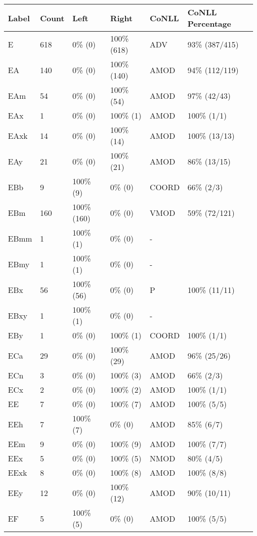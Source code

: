 \begin{figure*}
\begin{tabular}{|l|l|l|l||l|l|}
\hline
Label & Count & Left & Right & CoNLL & CoNLL Percentage\\ 
\hline
 E & 618 & 0\% (0) & 100\% (618) & ADV & 93\% (387/415) \\ 
\hline
 EA & 140 & 0\% (0) & 100\% (140) & AMOD & 94\% (112/119) \\ 
\hline
 EAm & 54 & 0\% (0) & 100\% (54) & AMOD & 97\% (42/43) \\ 
\hline
 EAx & 1 & 0\% (0) & 100\% (1) & AMOD & 100\% (1/1) \\ 
\hline
 EAxk & 14 & 0\% (0) & 100\% (14) & AMOD & 100\% (13/13) \\ 
\hline
 EAy & 21 & 0\% (0) & 100\% (21) & AMOD & 86\% (13/15) \\ 
\hline
 EBb & 9 & 100\% (9) & 0\% (0) & COORD & 66\% (2/3) \\ 
\hline
 EBm & 160 & 100\% (160) & 0\% (0) & VMOD & 59\% (72/121) \\ 
\hline
 EBmm & 1 & 100\% (1) & 0\% (0) & - &  \\ 
\hline
 EBmy & 1 & 100\% (1) & 0\% (0) & - &  \\ 
\hline
 EBx & 56 & 100\% (56) & 0\% (0) & P & 100\% (11/11) \\ 
\hline
 EBxy & 1 & 100\% (1) & 0\% (0) & - &  \\ 
\hline
 EBy & 1 & 0\% (0) & 100\% (1) & COORD & 100\% (1/1) \\ 
\hline
 ECa & 29 & 0\% (0) & 100\% (29) & AMOD & 96\% (25/26) \\ 
\hline
 ECn & 3 & 0\% (0) & 100\% (3) & AMOD & 66\% (2/3) \\ 
\hline
 ECx & 2 & 0\% (0) & 100\% (2) & AMOD & 100\% (1/1) \\ 
\hline
 EE & 7 & 0\% (0) & 100\% (7) & AMOD & 100\% (5/5) \\ 
\hline
 EEh & 7 & 100\% (7) & 0\% (0) & AMOD & 85\% (6/7) \\ 
\hline
 EEm & 9 & 0\% (0) & 100\% (9) & AMOD & 100\% (7/7) \\ 
\hline
 EEx & 5 & 0\% (0) & 100\% (5) & NMOD & 80\% (4/5) \\ 
\hline
 EExk & 8 & 0\% (0) & 100\% (8) & AMOD & 100\% (8/8) \\ 
\hline
 EEy & 12 & 0\% (0) & 100\% (12) & AMOD & 90\% (10/11) \\ 
\hline
 EF & 5 & 100\% (5) & 0\% (0) & AMOD & 100\% (5/5) \\ 
\hline

\end{tabular}
\end{figure*}

